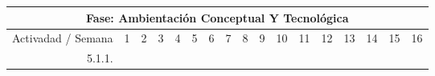 \documentclass[12pt]{article}
\begin{document}
\begin{table}[H]
{\begin{tabular}{|rllllllllllllllll|}
			\multicolumn{17}{|c|}{\cellcolor[HTML]{D9D9D9}Fase: Ambientación Conceptual Y Tecnológica}                                                                                                                                                                                                                                                                                                                                                                                                                                                                                                                                                                                                                                                                                                                                                                                                \\ \hline
			\multicolumn{1}{|l|}{\cellcolor[HTML]{D9D9D9}Activadad / Semana}   & \multicolumn{1}{c|}{\cellcolor[HTML]{B6D7A8}1} & \multicolumn{1}{c|}{\cellcolor[HTML]{B6D7A8}2} & \multicolumn{1}{c|}{\cellcolor[HTML]{B6D7A8}3} & \multicolumn{1}{c|}{\cellcolor[HTML]{B6D7A8}4} & \multicolumn{1}{c|}{\cellcolor[HTML]{A4C2F4}5} & \multicolumn{1}{c|}{\cellcolor[HTML]{A4C2F4}6} & \multicolumn{1}{c|}{\cellcolor[HTML]{A4C2F4}7} & \multicolumn{1}{c|}{\cellcolor[HTML]{A4C2F4}8} & \multicolumn{1}{c|}{\cellcolor[HTML]{B4A7D6}9} & \multicolumn{1}{c|}{\cellcolor[HTML]{B4A7D6}10} & \multicolumn{1}{c|}{\cellcolor[HTML]{B4A7D6}11} & \multicolumn{1}{c|}{\cellcolor[HTML]{B4A7D6}12} & \multicolumn{1}{c|}{\cellcolor[HTML]{EA9999}13} & \multicolumn{1}{c|}{\cellcolor[HTML]{EA9999}14} & \multicolumn{1}{c|}{\cellcolor[HTML]{EA9999}15} & \multicolumn{1}{c|}{\cellcolor[HTML]{EA9999}16} \\ \hline
			\multicolumn{1}{|r|}{5.1.1.}                                       & \multicolumn{1}{c|}{\cellcolor[HTML]{B6D7A8}}  & \multicolumn{1}{l|}{}                          & \multicolumn{1}{l|}{}                          & \multicolumn{1}{l|}{}                          & \multicolumn{1}{l|}{}                          & \multicolumn{1}{l|}{}                          & \multicolumn{1}{l|}{}                          & \multicolumn{1}{l|}{}                          & \multicolumn{1}{l|}{}                          & \multicolumn{1}{l|}{}                           & \multicolumn{1}{l|}{}                           & \multicolumn{1}{l|}{}                           & \multicolumn{1}{l|}{}                           & \multicolumn{1}{l|}{}                           & \multicolumn{1}{l|}{}                           &                                                 \\ \hline

\end{tabular}}
\end{table}
\end{document}
